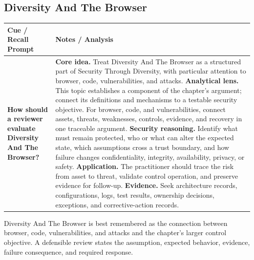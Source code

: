 \documentclass[11pt]{article}
\newcommand{\CornellHeader}{%
\rowcolor{Navy}\color{white}\bfseries Cue / Recall Prompt & \color{white}\bfseries Notes / Analysis\\\hline}
\newcommand{\CornellRow}[2]{%
\cellcolor{CueGray}\RaggedRight\textbf{#1} & \RaggedRight #2\\\hline}
\begin{document}
\subsection*{Diversity And The Browser}
\begin{longtable}{>{\RaggedRight\arraybackslash}p{}|>{\RaggedRight\arraybackslash}p{}}
\CornellHeader
\CornellRow{How should a reviewer evaluate Diversity And The Browser?}{\textbf{Core idea.} Treat Diversity And The Browser as a structured part of Security Through Diversity, with particular attention to browser, code, vulnerabilities, and attacks. \textbf{Analytical lens.} This topic establishes a component of the chapter's argument; connect its definitions and mechanisms to a testable security objective. For browser, code, and vulnerabilities, connect assets, threats, weaknesses, controls, evidence, and recovery in one traceable argument. \textbf{Security reasoning.} Identify what must remain protected, who or what can alter the expected state, which assumptions cross a trust boundary, and how failure changes confidentiality, integrity, availability, privacy, or safety. \textbf{Application.} The practitioner should trace the risk from asset to threat, validate control operation, and preserve evidence for follow-up. \textbf{Evidence.} Seek architecture records, configurations, logs, test results, ownership decisions, exceptions, and corrective-action records.}
\end{longtable}
\begin{topicsummary}
Diversity And The Browser is best remembered as the connection between browser, code, vulnerabilities, and attacks and the chapter's larger control objective. A defensible review states the assumption, expected behavior, evidence, failure consequence, and required response.
\end{topicsummary}
\end{document}
